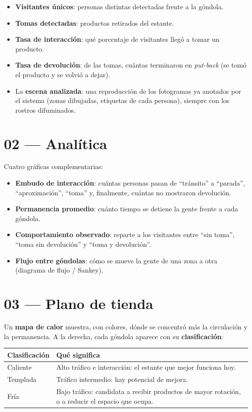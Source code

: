 \documentclass[11pt,a4paper]{report}
\begin{document}
\begin{itemize}
  \item \textbf{Visitantes únicos}: personas distintas detectadas frente a la góndola.
  \item \textbf{Tomas detectadas}: productos retirados del estante.
  \item \textbf{Tasa de interacción}: qué porcentaje de visitantes llegó a tomar un producto.
  \item \textbf{Tasa de devolución}: de las tomas, cuántas terminaron en \textit{put-back}
    (se tomó el producto y se volvió a dejar).
  \item La \textbf{escena analizada}: una reproducción de los fotogramas ya anotados por el
    sistema (zonas dibujadas, etiquetas de cada persona), siempre con los rostros difuminados.
\end{itemize}

\section{02 --- Analítica}

Cuatro gráficas complementarias:

\begin{itemize}
  \item \textbf{Embudo de interacción}: cuántas personas pasan de ``tránsito'' a ``parada'',
    ``aproximación'', ``toma'' y, finalmente, cuántas no mostraron devolución.
  \item \textbf{Permanencia promedio}: cuánto tiempo se detiene la gente frente a cada góndola.
  \item \textbf{Comportamiento observado}: reparte a los visitantes entre ``sin toma'', ``toma
    sin devolución'' y ``toma y devolución''.
  \item \textbf{Flujo entre góndolas}: cómo se mueve la gente de una zona a otra (diagrama de
    flujo / Sankey).
\end{itemize}

\section{03 --- Plano de tienda}

Un \textbf{mapa de calor} muestra, con colores, dónde se concentró más la circulación y la
permanencia. A la derecha, cada góndola aparece con su \textbf{clasificación}:

\begin{center}
\begin{tabular}{lp{10.5cm}}
\toprule
\rowcolor{rvCodeBg}\textbf{Clasificación} & \textbf{Qué significa} \\
\midrule
\textcolor{rvRed}{Caliente} & Alto tráfico e interacción: el estante que mejor funciona hoy. \\
Templada & Tráfico intermedio: hay potencial de mejora. \\
\textcolor{rvMuted}{Fría} & Bajo tráfico: candidata a recibir productos de mayor rotación, o a
reducir el espacio que ocupa. \\
\bottomrule
\end{tabular}
\end{center}
\end{document}
